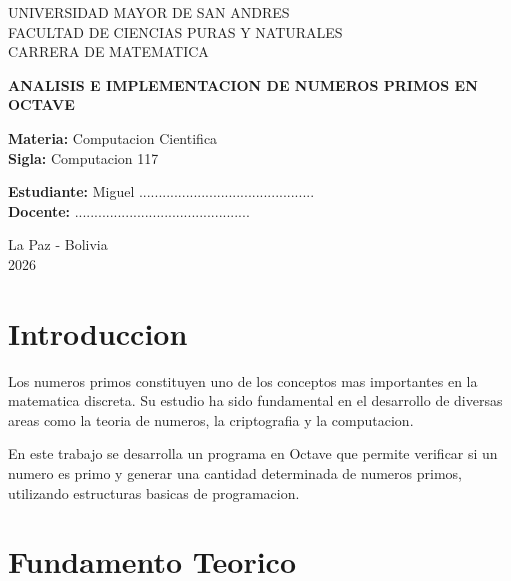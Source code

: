 \documentclass[12pt]{article}
\begin{document}
\begin{titlepage}
\centering

{\large UNIVERSIDAD MAYOR DE SAN ANDRES \\
FACULTAD DE CIENCIAS PURAS Y NATURALES \\
CARRERA DE MATEMATICA \\}

\vspace{2cm}

{\Large \textbf{ANALISIS E IMPLEMENTACION DE NUMEROS PRIMOS EN OCTAVE}}

\vspace{2cm}

\textbf{Materia:} Computacion Cientifica \\
\textbf{Sigla:} Computacion 117 \\

\vspace{2cm}

\textbf{Estudiante:} Miguel ............................................. \\
\textbf{Docente:} ............................................. \\

\vfill

La Paz - Bolivia \\
2026

\end{titlepage}

\tableofcontents
\newpage

\section{Introduccion}

Los numeros primos constituyen uno de los conceptos mas importantes en la matematica discreta. Su estudio ha sido fundamental en el desarrollo de diversas areas como la teoria de numeros, la criptografia y la computacion.

En este trabajo se desarrolla un programa en Octave que permite verificar si un numero es primo y generar una cantidad determinada de numeros primos, utilizando estructuras basicas de programacion.

\section{Fundamento Teorico}
\end{document}
